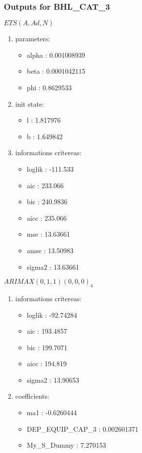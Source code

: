 \documentclass[10pt,a4paper]{article}\usepackage[]{graphicx}\usepackage[]{color}
\newcommand{\AaA}{\_}
\begin{document}
\subsubsection{Outputs for BHL\AaA CAT\AaA 3}
\begin{multicols}{2}


$ ETS(A,Ad,N) $
\begin{enumerate}
\item parameters:
\begin{itemize}
\item  alpha :  0.001008939 
\item  beta :  0.0001042115 
\item  phi :  0.8629533 
\end{itemize}
\item init state:
\begin{itemize}
\item  l :  1.817976 
\item  b :  1.649842 
\end{itemize}
\item informations critereas:
\begin{itemize}
\item  loglik :  -111.533 
\item  aic :  233.066 
\item  bic :  240.9836 
\item  aicc :  235.066 
\item  mse :  13.63661 
\item  amse :  13.50983 
\item  sigma2 :  13.63661 
\end{itemize}
\end{enumerate}

\columnbreak


 $ARIMAX(0,1,1)(0,0,0)_{4}$ 
\begin{enumerate}
\item informations critereas:
\begin{itemize}
\item  loglik :  -92.74284 
\item  aic :  193.4857 
\item  bic :  199.7071 
\item  aicc :  194.819 
\item  sigma2 :  13.90653 
\end{itemize}

\item coefficients:
\begin{itemize}
\item  ma1 :  -0.6260444 
\item  DEP\AaA EQUIP\AaA CAP\AaA 3 :  0.002601371 
\item  My_S_Dummy :  7.270153 
\end{itemize}
\end{enumerate}
\end{multicols}
\end{document}
